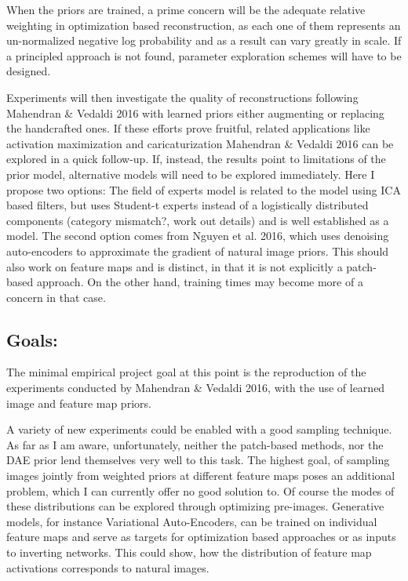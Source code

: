 \documentclass{article}
\begin{document}
When the priors are trained, a prime concern will be the adequate relative weighting in optimization based reconstruction, as each one of them represents an un-normalized negative log probability and as a result can vary greatly in scale. If a principled approach is not found, parameter exploration schemes will have to be designed.

Experiments will then investigate the quality of reconstructions following Mahendran \& Vedaldi 2016 with learned priors either augmenting or replacing the handcrafted ones.
If these efforts prove fruitful, related applications like activation maximization and caricaturization Mahendran \& Vedaldi 2016 can be explored in a quick follow-up. If, instead, the results point to limitations of the prior model, alternative models will need to be explored immediately. Here I propose two options: The field of experts model is related to the model using ICA based filters, but uses Student-t experts instead of a logistically distributed components (category mismatch?, work out details) and is well established as a model. The second option comes from Nguyen et al. 2016, which uses denoising auto-encoders to approximate the gradient of natural image priors. This should also work on feature maps and is distinct, in that it is not explicitly a patch-based approach. On the other hand, training times may become more of a concern in that case.

\subsection{Goals:}

The minimal empirical project goal at this point is the reproduction of the experiments conducted by Mahendran \& Vedaldi 2016, with the use of learned image and feature map priors.

A variety of new experiments could be enabled with a good sampling technique. As far as I am aware, unfortunately, neither the patch-based methods, nor the DAE prior lend themselves very well to this task. The highest goal, of sampling images jointly from weighted priors at different feature maps poses an additional problem, which I can currently offer no good solution to. Of course the modes of these distributions can be explored through optimizing pre-images. 
Generative models, for instance Variational Auto-Encoders, can be trained on individual feature maps and serve as targets for optimization based approaches or as inputs to inverting networks. This could show, how the distribution of feature map activations corresponds to natural images.
\end{document}
